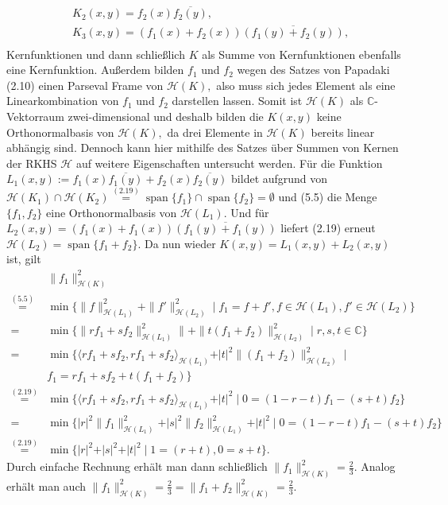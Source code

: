 \documentclass[12pt,titlepage,twoside,cleardoublepage]{article}
\theoremstyle{nummermitklammern}
\numberwithin{equation}{section}
\DeclareMathOperator{\Span}{span}
\begin{document}
\begin{itemize}
\begin{align*}
&K_2(x,y)=f_2(x)\overline{f_2(y)},\\
&K_3(x,y)=(f_1(x)+f_2(x))\overline{(f_1(y)+f_2(y))},\\
\end{align*}
 Kernfunktionen und dann schließlich $K$ als Summe von Kernfunktionen ebenfalls eine Kernfunktion.
 Außerdem bilden $f_1$ und $f_2$ wegen des Satzes von Papadaki (2.10) einen Parseval Frame von $\mathcal{H}(K),$ also muss sich jedes Element als eine Linearkombination von $f_1$ und $f_2$ darstellen lassen. Somit ist $\mathcal{H}(K)$ als $\mathbb{C}$-Vektorraum zwei-dimensional und deshalb bilden die $K(x,y)$ keine Orthonormalbasis von $\mathcal{H}(K),$ da drei Elemente in $\mathcal{H}(K)$ bereits linear abhängig sind. Dennoch kann hier mithilfe des Satzes über Summen von Kernen der RKHS $\mathcal{H}$ auf weitere Eigenschaften untersucht werden.
   Für die Funktion $L_1(x,y):=f_1(x)\overline{f_1(y)}+f_2(x)\overline{f_2(y)}$ bildet aufgrund von $\mathcal{H}(K_1)\cap \mathcal{H}(K_2)\overset{{(2.19)}}{=}\Span\{f_1\}\cap \Span\{f_2\}=\emptyset$ und (5.5) die Menge $\{f_1,f_2\}$ eine Orthonormalbasis von $\mathcal{H}(L_1).$ Und für $L_2(x,y)=(f_1(x)+f_1(x))\overline{(f_1(y)+f_1(y))}$ liefert (2.19) erneut $\mathcal{H}(L_2)=\Span\{f_1+f_2\}.$ Da nun wieder $K(x,y)=L_1(x,y)+L_2(x,y)$ ist, gilt
   \begin{align*}
   &\|f_1\|^2_{\mathcal{H}(K)}\\
   \overset{(5.5)}{=}&\min\{\|f\|^2_{\mathcal{H}(L_1)}+\|f'\|^2_{\mathcal{H}(L_2)}\mid f_1=f+f',f\in \mathcal{H}(L_1),f' \in  \mathcal{H}(L_2)\}\\
   =&\min\{\|rf_1+sf_2\|^2_{\mathcal{H}(L_1)}\|+\|t(f_1+f_2)\|^2_{\mathcal{H}(L_2)}\mid r,s,t \in \mathbb{C}\}   \\
 =&\min\{\langle rf_1+sf_2,rf_1+sf_2\rangle_{\mathcal{H}(L_1)}+\vert t\vert^2\|(f_1+f_2)\|^2_{\mathcal{H}(L_2)}\mid\\ &f_1=rf_1+sf_2+t(f_1+f_2)\}\\
 \overset{(2.19)}{=}&\min\{\langle rf_1+sf_2,rf_1+sf_2\rangle_{\mathcal{H}(L_1)}+\vert t \vert^2\mid 0=(1-r-t)f_1-(s+t)f_2
 \}\\   
=&\min\{\vert r\vert^2 \| f_1\|^2_{\mathcal{H}(L_1)}+\vert s\vert^2 \| f_2\|^2_{\mathcal{H}(L_1)}+\vert t \vert^2\mid 0=(1-r-t)f_1-(s+t)f_2
 \}\\ 
\overset{(2.19)}{=}&\min\{\vert r\vert^2 +\vert s\vert^2 +\vert t \vert^2\mid 1=(r+t),0=s+t\}.
   \end{align*}
   Durch einfache Rechnung erhält man dann schließlich $\|f_1\|^2_{\mathcal{H}(K)}=\frac{2}{3}.$ Analog erhält man auch $\|f_1\|^2_{\mathcal{H}(K)}=\frac{2}{3}=\|f_1+f_2\|^2_{\mathcal{H}(K)}=\frac{2}{3}.$
   \end{itemize}
 
\end{document}
